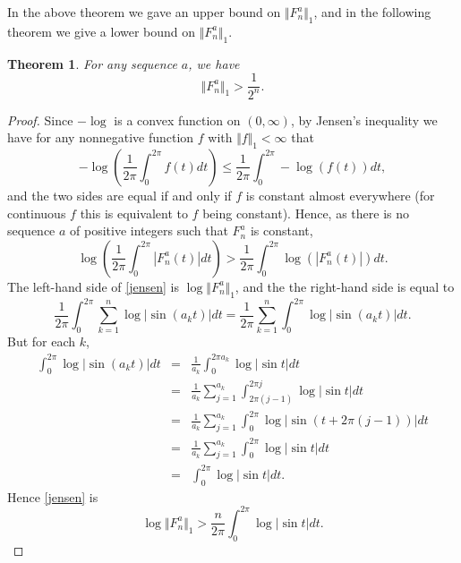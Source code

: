\documentclass{article}
\newcommand{\norm}[1]{\Vert #1 \Vert}
\newtheorem{theorem}{Theorem}
\begin{document}
In the above theorem we gave an upper bound on $\norm{F_n^a}_1$, and in the following theorem we give a lower bound on
$\norm{F_n^a}_1$.

\begin{theorem} 
For any sequence $a$, we have
\[
\norm{F_n^a}_1 > \frac{1}{2^n}.
\]
\label{lowerbound}
\end{theorem}
\begin{proof}
Since $-\log$ is a convex function on $(0,\infty)$, by Jensen's inequality \cite[p.~44, Theorem 2.2]{lieb} 
we have for any nonnegative function $f$ with $\norm{f}_1 < \infty$ that
\[
-\log \left(\frac{1}{2\pi} \int_0^{2\pi} f(t) dt \right) \leq \frac{1}{2\pi} \int_0^{2\pi} -\log(f(t)) dt,
\]
and the two sides are equal if and only if $f$ is constant almost everywhere (for continuous $f$ this is equivalent to $f$ being constant).
Hence, as there is no sequence $a$ of positive integers such that $F_n^a$ is constant,
\begin{equation}
\log\left( \frac{1}{2\pi} \int_0^{2\pi} |F_n^a(t)| dt \right)
> \frac{1}{2\pi} \int_0^{2\pi} \log(|F_n^a(t)|) dt.
\label{jensen}
\end{equation}
The left-hand side of \eqref{jensen} is $\log \norm{F_n^a}_1$, and the
the right-hand side is equal to
\[
\frac{1}{2\pi} \int_0^{2\pi} \sum_{k=1}^n \log |\sin(a_k t)| dt=
\frac{1}{2\pi} \sum_{k=1}^n \int_0^{2\pi} \log|\sin (a_kt)| dt.
\]
But for each $k$,
\begin{eqnarray*}
\int_0^{2\pi} \log|\sin (a_kt)|dt&=&\frac{1}{a_k} \int_0^{2\pi a_k} \log |\sin t| dt\\
&=&\frac{1}{a_k} \sum_{j=1}^{a_k} \int_{2\pi(j-1)}^{2\pi j} \log|\sin t| dt\\
&=&\frac{1}{a_k} \sum_{j=1}^{a_k} \int_0^{2\pi} \log|\sin(t+2\pi(j-1))| dt  \\
&=&\frac{1}{a_k} \sum_{j=1}^{a_k} \int_0^{2\pi} \log |\sin t| dt\\
&=&\int_0^{2\pi} \log|\sin t|dt.
\end{eqnarray*}
Hence  \eqref{jensen} is
\[
\log \norm{F_n^a}_1 > \frac{n}{2\pi} \int_0^{2\pi} \log|\sin t|dt.
\]


\end{proof}
\end{document}
